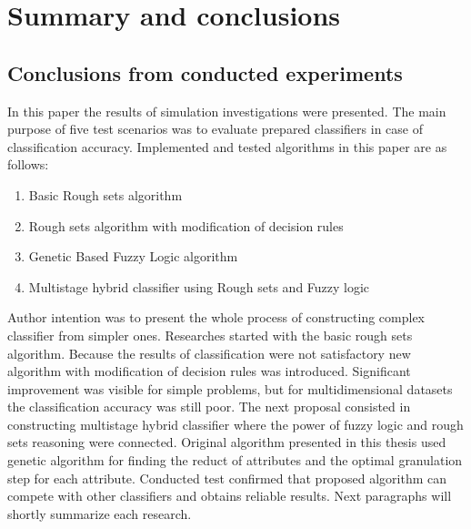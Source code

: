 \section{Summary and conclusions}
\label{cha:Summary}
\subsection{Conclusions from conducted experiments}
In this paper the results of simulation investigations were presented. The main
purpose of five test scenarios was to evaluate prepared classifiers in case of
classification accuracy. Implemented and tested algorithms in this paper are as follows:
\begin{enumerate}
    \item Basic Rough sets algorithm
    \item Rough sets algorithm with modification of decision rules
    \item Genetic Based Fuzzy Logic algorithm
    \item Multistage hybrid classifier using Rough sets and Fuzzy logic
\end{enumerate}
Author intention was to present the whole process of constructing complex
classifier from simpler ones. Researches started with the basic rough sets
algorithm. Because the results of classification were not satisfactory new
algorithm with modification of decision rules was introduced. Significant
improvement was visible for simple problems, but for multidimensional datasets
the classification accuracy was still poor. The next proposal consisted in
constructing multistage hybrid classifier where the power of fuzzy logic and
rough sets reasoning were connected. Original algorithm presented in this
thesis used genetic algorithm for finding the reduct of attributes and the
optimal granulation step for each attribute. Conducted test confirmed that
proposed algorithm can compete with other classifiers and obtains reliable
results. Next paragraphs will shortly summarize each research. 

